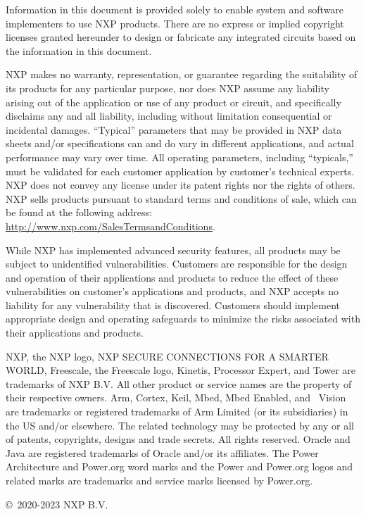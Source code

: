 \begin{flushleft}
\textsf{Information in this document is provided solely to enable system and software implementers to use NXP products. There are no express or implied copyright licenses granted hereunder to design or fabricate any integrated circuits based on the information in this document.}\newline

\textsf{NXP makes no warranty, representation, or guarantee regarding the suitability of its products for any particular purpose, nor does NXP assume any liability arising out of the application or use of any product or circuit, and specifically disclaims any and all liability, including without limitation consequential or incidental damages. “Typical” parameters that may be provided in NXP data sheets and/or specifications can and do vary in different applications, and actual performance may vary over time. All operating parameters, including “typicals,” must be validated for each customer application by customer's technical experts. NXP does not convey any license under its patent rights nor the rights of others. NXP sells products pursuant to standard terms and conditions of sale, which can be found at the following address: \url{http://www.nxp.com/SalesTermsandConditions}.} \newline

\textsf{While NXP has implemented advanced security features, all products may be subject to unidentified vulnerabilities. Customers are responsible for the design and operation of their applications and products to reduce the effect of these vulnerabilities on customer's applications and products, and NXP accepts no liability for any vulnerability that is discovered. Customers should implement appropriate design and operating safeguards to minimize the risks associated with their applications and products.} \newline


\textsf{NXP, the NXP logo, NXP SECURE CONNECTIONS FOR A SMARTER WORLD, Freescale, the Freescale logo, Kinetis, Processor Expert, and Tower are trademarks of NXP B.V. All other product or service names are the property of their respective owners. Arm, Cortex, Keil, Mbed, Mbed Enabled, and ~{\textmu}Vision are trademarks or registered trademarks of Arm Limited (or its subsidiaries) in the US and/or elsewhere. The related technology may be protected by any or all of patents, copyrights, designs and trade secrets. All rights reserved. Oracle and Java are registered trademarks of Oracle and/or its affiliates. The Power Architecture and Power.org word marks and the Power and Power.org logos and related marks are trademarks and service marks licensed by Power.org.} \newline

\textsf{
\copyright~2020-2023 NXP B.V.}
\end{flushleft}


